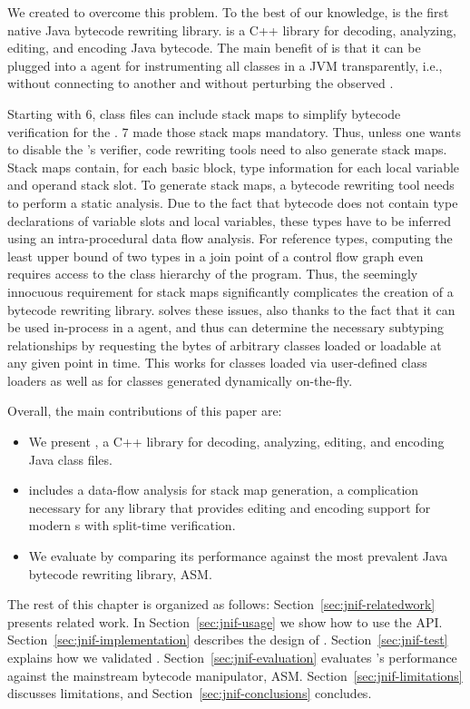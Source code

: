 We created \jnif{} to overcome this problem. 
To the best of our knowledge, \jnif{} is the first native Java bytecode rewriting library.
\jnif{} is a C++ library for decoding, analyzing, editing, and encoding Java bytecode.
The main benefit of \jnif{} is that it can be plugged into a \jvmti{} agent 
for instrumenting all classes in a JVM transparently, i.e., 
without connecting to another \jvm{} and without perturbing the observed \jvm{}.

Starting with \java{} 6, class files can include stack maps to
simplify bytecode verification for the \jvm{}.
\java{} 7 made those stack maps mandatory.
Thus, unless one wants to disable the \jvm{}'s verifier,
code rewriting tools need to also generate stack maps.
Stack maps contain, for each basic block,
type information for each local variable and operand stack slot.
To generate stack maps, a bytecode rewriting tool needs to perform a static analysis.
Due to the fact that bytecode does not contain type declarations of variable slots and local variables,
these types have to be inferred using an intra-procedural data flow analysis.
For reference types, 
computing the least upper bound of two types in a join point of a control flow graph 
even requires access to the class hierarchy of the program.
Thus, the seemingly innocuous requirement for stack maps
significantly complicates the creation of a bytecode rewriting library.
\jnif{} solves these issues, also thanks to the fact that it can be
used in-process in a \jvmti{} agent,
and thus can determine the necessary subtyping relationships 
by requesting the bytes of arbitrary classes loaded or loadable at any given point in time.
This works for classes loaded via user-defined class loaders as well as
for classes generated dynamically on-the-fly.

Overall, the main contributions of this paper are:

\begin{itemize}
	\item We present \jnif{}, a C++ library for decoding, analyzing, editing, and encoding Java class files.
	\item \jnif{} includes a data-flow analysis for stack map generation, 
	      a complication necessary for any library that provides editing and encoding support for modern \jvm{}s with split-time verification.
	\item We evaluate \jnif{} by comparing its performance against the most prevalent Java bytecode rewriting library, ASM.
\end{itemize}

The rest of this chapter is organized as follows:
Section~\ref{sec:jnif-relatedwork} presents related work.
In Section~\ref{sec:jnif-usage} we show how to use the \jnif{} API.
Section~\ref{sec:jnif-implementation} describes the design of \jnif{}.
Section~\ref{sec:jnif-test} explains how we validated \jnif{}.
Section~\ref{sec:jnif-evaluation} evaluates \jnif{}'s performance against the mainstream bytecode manipulator, ASM.
Section~\ref{sec:jnif-limitations} discusses limitations, and 
Section~\ref{sec:jnif-conclusions} concludes.